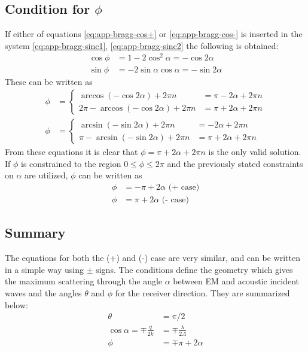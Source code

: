 \documentclass[11pt,twoside]{eitExjobb}
\begin{document}
	\subsection{Condition for $\phi$}
	If either of equations \eqref{eq:app-bragg-cos+} or \eqref{eq:app-bragg-cos-} is inserted in the system \eqref{eq:app-bragg-sinc1}, \eqref{eq:app-bragg-sinc2} the following is obtained:
	\begin{align*}
		\cos{\phi} &= 1 - 2\cos^2{\alpha} = -\cos{2\alpha} \\
		\sin{\phi} &= -2\sin{\alpha}\cos{\alpha} = -\sin{2\alpha}
	\end{align*}
	These can be written as
	\begin{align*}
		\phi &=
		\begin{cases}
			\arccos(-\cos{2\alpha}) + 2\pi n &= \pi - 2\alpha + 2\pi n \\
			2\pi - \arccos(-\cos{2\alpha}) + 2\pi n &= \pi + 2\alpha + 2\pi n
		\end{cases} \\
		\phi &=
		\begin{cases}
			\arcsin(-\sin{2\alpha}) + 2\pi n &= -2\alpha + 2\pi n \\
			\pi - \arcsin(-\sin{2\alpha}) + 2\pi n &= \pi + 2\alpha + 2\pi n
		\end{cases}
	\end{align*}
	From these equations it is clear that $\phi = \pi + 2\alpha + 2\pi n$ is the only valid solution. If $\phi$ is constrained to the region $0 \leq \phi \leq 2\pi$ and the previously stated constraints on $\alpha$ are utilized, $\phi$ can be written as
	\begin{align*}
		\phi &= -\pi + 2\alpha \text{ (+ case)}\\
		\phi &= \pi + 2\alpha \text{ (- case)}
	\end{align*}
	
	\subsection{Summary}
	The equations for both the (+) and (-) case are very similar, and can be written in a simple way using $\pm$ signs. The conditions define the geometry which gives the maximum scattering through the angle $\alpha$ between EM and acoustic incident waves and the angles $\theta$ and $\phi$ for the receiver direction. They are summarized below:
	\begin{align}
		\theta &= \pi/2 \label{eq:app-bragg-theta}\\
		\cos{\alpha} = \mp \frac{q}{2k} &= \mp \frac{\lambda}{2\Lambda} \label{eq:app-bragg-alpha}\\
		\phi &= \mp \pi + 2\alpha \label{eq:app-bragg-phi}
	\end{align}
	
\end{document}
